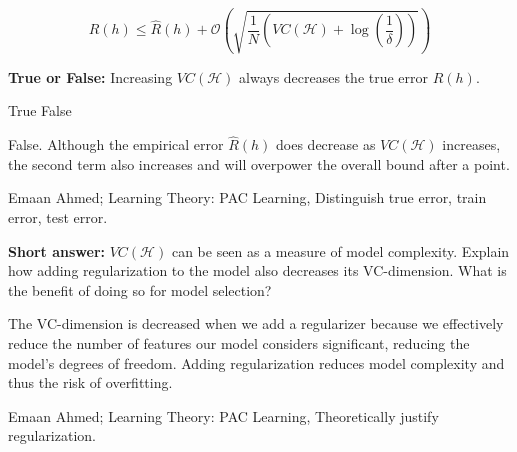 \begin{parts}
\[R(h) \leq \hat{R}(h) + \mathcal{O}\left(\sqrt{\frac{1}{N}\left(VC(\mathcal{H}) + \log(\frac{1}{\delta}) \right)} \right)\]

    \begin{subparts}
    \subpart[1] \textbf{True or False:} Increasing $VC(\mathcal{H})$ always decreases the true error $R(h)$.
    \begin{checkboxes}
     \choice True 
     \choice False
    \end{checkboxes}
    
    \begin{soln}
        False. Although the empirical error $\hat{R}(h)$ does decrease as $VC(\mathcal{H})$ increases, the second term also increases and will overpower the overall bound after a point.
    \end{soln}
        
    \begin{qauthor}
        Emaan Ahmed; Learning Theory: PAC Learning, Distinguish true error, train error, test error.
    \end{qauthor}
        
    \subpart[2] \textbf{Short answer:} $VC(\mathcal{H})$ can be seen as a measure of model complexity. Explain how adding regularization to the model also decreases its VC-dimension. What is the benefit of doing so for model selection?
    \fillwithlines{8em}
    
    \begin{soln}
        The VC-dimension is decreased when we add a regularizer because we effectively reduce the number of features our model considers significant, reducing the model's degrees of freedom. Adding regularization reduces model complexity and thus the risk of overfitting.
    \end{soln}
    
    \begin{qauthor}
        Emaan Ahmed; Learning Theory: PAC Learning, Theoretically justify regularization.
    \end{qauthor}

    
    
    
    
    \end{subparts}


\end{parts}